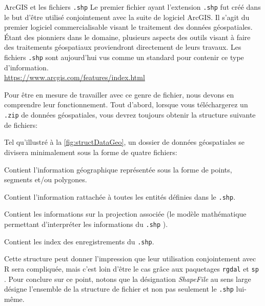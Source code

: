 \begin{moreInfo}{ArcGIS et les fichiers \texttt{.shp}}
	Le premier fichier ayant l'extension \texttt{.shp} fut créé dans le but d'être utilisé conjointement avec la suite de logiciel ArcGIS. Il s'agit du premier logiciel commercialisable visant le traitement des données géospatiales. Étant des pionniers dans le domaine, plusieurs aspects des outils visant à faire des traitements géospatiaux proviendront directement de leurs travaux. Les fichiers \texttt{.shp} sont aujourd'hui vus comme un standard pour contenir ce type d'information. \\
\url{https://www.arcgis.com/features/index.html}
\end{moreInfo}

Pour être en mesure de travailler avec ce genre de fichier, nous devons en comprendre leur fonctionnement. Tout d'abord, lorsque vous téléchargerez un \texttt{.zip} de données géospatiales, vous devrez toujours obtenir la structure suivante de fichiers: \\


Tel qu'illustré à la \autoref{fig:structDataGeo}, un dossier de données géospatiales se divisera minimalement sous la forme de quatre fichiers:
\begin{description}[style=multiline,leftmargin=1.5cm]
	\item[\texttt{.shp}] Contient l'information géographique représentée sous la forme de points, segments et/ou polygones.
	\item[\texttt{.dbf}] Contient l'information rattachée à toutes les entités définies dans le \texttt{.shp}.
	\item[\texttt{.prj}] Contient les informations sur la projection associée (le modèle mathématique permettant d'interpréter les informations du \texttt{.shp} \cite{projectionSIG}).
	\item[{.shx}] Contient les index des enregistrements du \texttt{.shp}.
\end{description}
Cette structure peut donner l'impression que leur utilisation conjointement avec R sera compliquée, mais c'est loin d'être le cas grâce aux paquetages \texttt{rgdal} \cite{Rpackage:rgdal} et \texttt{sp}\cite{Rpackage:sp} . Pour conclure sur ce point, notons que la désignation \emph{ShapeFile} au sens large désigne l'ensemble de la structure de fichier et non pas seulement le \texttt{.shp} lui-même. \cite{portailSIG} \\

